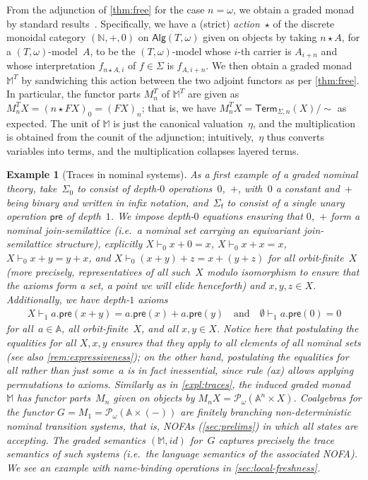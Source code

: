 \documentclass[11pt,a4paper]{amsart}
\newtheorem{example}[example]{Example}
\newcommand{\pre}{\mathsf{pre}}
\newcommand{\Alg}{\mathsf{Alg}}
\newcommand{\Term}{\mathsf{Term}}
\newcommand{\sig}{\Sigma}
\newcommand{\sigp}{\Sigma_0}
\newcommand{\sigf}{\Sigma_{\mathsf f}}
\newcommand{\Names}{\mathbb{A}}
\newcommand{\pow}{\mathcal{P}}
\newcommand{\powf}{\pow_{\omega}}
\theoremstyle{plain}
\newcommand{\id}{\mathit{id}}
\numberwithin{equation}{section}
\newcommand{\Nat}{{\mathbb{N}}}
\newcommand{\monad}{{\mathbb{M}}}
\newcommand{\+}[1]{\mathcal{#1}\xspace}
\theoremstyle{definition}
\begin{document}
\noindent From the adjunction of \cref{thm:free} for the case
$n=\omega$, we obtain a graded monad by standard
results~\cite[Section~3]{FujiiEA16}.  Specifically, we have a (strict) \emph{action}~$\star$
of the discrete monoidal category $(\Nat,+,0)$ on $\Alg(T,\omega)$
given on objects by taking $n\star A$, for a $(T,\omega)$-model~$A$,
to be the $(T,\omega)$-model whose $i$-th carrier is $A_{i+n}$ and whose
interpretation $f_{n\star A,i}$ of $f\in\sig$ is $f_{A,i+n}$. We then
obtain a graded monad $\monad^T$ by sandwiching this action between
the two adjoint functors as per \cref{thm:free}. In particular, the
functor parts $M^T_n$ of $\monad^T$ are given as
$M^T_nX=(n\star FX)_0=(FX)_n$; that is, we have $M^T_nX=\Term_{\Sigma,n}(X)/\sim$
as expected. The unit of $\monad$ is just the canonical
valuation~$\eta$, and the multiplication is obtained from the counit
of the adjunction; intuitively,~$\eta$ thus converts variables into
terms, and the multiplication collapses layered terms.


\begin{example}[Traces in nominal systems]\label{expl:nominal-ts}
  As a first example of a graded nominal theory, take~$\sigp$ to
  consist of depth-$0$ operations~$0$,~$+$, with~$0$ a constant
  and~$+$ being binary and written in infix notation, and~$\sigf$ to
  consist of a single unary operation $\pre$ of depth~$1$. We impose
  depth-$0$ equations ensuring that $0$,~$+$ form a \emph{nominal join-semilattice} (i.e.~a nominal set carrying an equivariant
  join-semilattice structure), explicitly $X\vdash_0 x+0=x$,
  $X\vdash_0 x+x=x$, $X\vdash_0 x+y=y+x$, and
  $X\vdash_0 (x+y)+z=x+(y+z)$ for all orbit-finite~$X$ (more
  precisely, representatives of all such~$X$ modulo isomorphism to
  ensure that the axioms form a set, a point we will elide henceforth)
  and $x,y,z\in X$. Additionally, we have depth-$1$ axioms
  \begin{gather}
    X\vdash_1a.\pre(x+y)=a.\pre(x)+a.\pre(y)
    \quad\text{and}\quad
    \emptyset\vdash_1 a.\pre(0)=0\label{ax:distributivity-pre}
  \end{gather}
  for all~$a\in\Names$, all orbit-finite~$X$, and all $x,y\in X$.
  Notice here that postulating the equalities for \emph{all} $X,x,y$
  ensures that they apply to all elements of all nominal sets (see
  also \cref{rem:expressiveness}); on the other hand, postulating the
  equalities for all rather than just some~$a$ is in fact inessential,
  since rule (ax) allows applying permutations to axioms. Similarly as
  in \cref{expl:traces}, the induced graded monad~$\monad$ has functor
  parts~$M_n$ given on objects by $M_nX=\powf(\Names^n\times
  X)$. Coalgebras for the functor $G=M_1=\powf(\Names\times(-))$ are
  finitely branching \emph{non-deterministic nominal transition
    systems}, that is, NOFAs (\cref{sec:prelims}) in which all states
  are accepting. The graded semantics $(\monad,\id)$ for~$G$ captures
  precisely the trace semantics of such systems (i.e.\ the language
  semantics of the associated NOFA). We see an example with
  name-binding operations in \cref{sec:local-freshness}.
\end{example}
\end{document}
